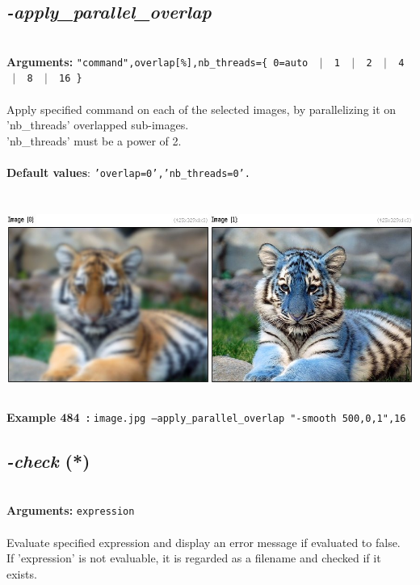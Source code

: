 \documentclass[a4paper,11pt,twoside]{book}
\begin{document}
\subsection{\emph{-apply\_parallel\_overlap} }\vspace*{-0.5em}
~\\\textbf{Arguments: } 
{\small \texttt{"command",overlap[\%],nb\_threads=\{ 0=auto ~$|$~ 1 ~$|$~ 2 ~$|$~ 4 ~$|$~ 8 ~$|$~ 16 \}}}\\~\\
Apply specified command on each of the selected images, by parallelizing it on 'nb\_threads' overlapped sub-images.
~\\'nb\_threads' must be a power of 2.
~\\~\\\textbf{Default values}: {\small \texttt{'overlap=0','nb\_threads=0'.}}
\begin{center}\includegraphics[keepaspectratio=true,height=7cm,width=\textwidth]{img/gmic_def484.jpg}\\
{\footnotesize \textbf{Example 484~:} \texttt{image.jpg --apply\_parallel\_overlap "-smooth 500,0,1",16}}
\end{center}

\subsection{\emph{-check} (*)}\vspace*{-0.5em}
~\\\textbf{Arguments: } 
{\small \texttt{expression}}\\~\\
Evaluate specified expression and display an error message if evaluated to false.
~\\If 'expression' is not evaluable, it is regarded as a filename and checked if it exists.
\end{document}
